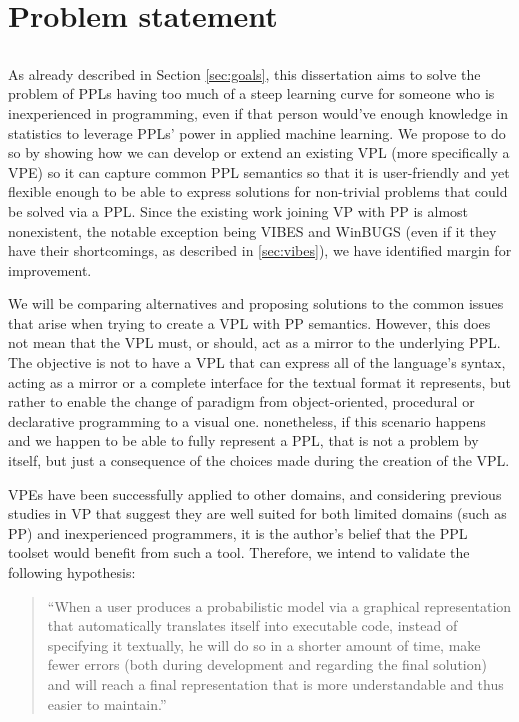 \chapter{Problem statement}\label{chap:chap3}

\section*{}

As already described in Section \ref{sec:goals}, this dissertation aims to solve
the problem of PPLs having too much of a steep learning curve for someone who
is inexperienced in programming, even if that person would've enough knowledge
in statistics to leverage PPLs' power in applied machine learning. We propose
to do so by showing how we can develop or extend an existing VPL (more specifically
a VPE) so it can capture common PPL semantics so that it is user-friendly
and yet flexible enough to be able to express solutions for non-trivial problems
that could be solved via a PPL. Since the existing work joining VP with PP is almost nonexistent, the notable exception
being VIBES and WinBUGS (even if it they have their shortcomings, as described in \ref{sec:vibes}),
we have identified margin for improvement.

We will be comparing alternatives and proposing solutions to the common issues that
arise when trying to create a VPL with PP semantics. However, this does not mean that
the VPL must, or should, act as a mirror to the underlying PPL. The objective
is not to have a VPL that can express all of the language's syntax, acting as
a mirror or a complete interface for the textual format it represents, but rather
to enable the change of paradigm from object-oriented, procedural or declarative programming
to a visual one. nonetheless, if this scenario happens and we happen to be able
to fully represent a PPL, that is not a problem by itself, but just a consequence
of the choices made during the creation of the VPL.

VPEs have been successfully applied to other domains, and considering previous studies in VP that suggest they
are well suited for both limited domains (such as PP) and inexperienced programmers, it is the
author's belief that the PPL toolset would benefit from such a tool.
Therefore, we intend to validate the following hypothesis:

\begin{quote}
  ``When a user produces a probabilistic model via a graphical representation that automatically translates
  itself into executable code, instead of specifying it textually,
  he will do so in a shorter amount of time, make
  fewer errors (both during development and regarding the final solution) and
  will reach a final representation that is more understandable and thus
  easier to maintain.''
\end{quote}

